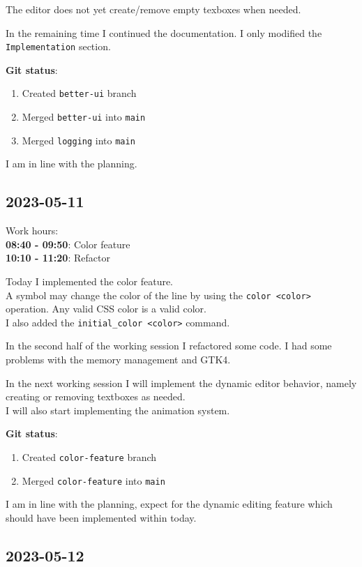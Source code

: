 \documentclass{article}
\begin{document}
The editor does not yet create/remove empty texboxes when needed.

In the remaining time I continued the documentation.
I only modified the \texttt{Implementation} section.

\textbf{Git status}:
\begin{enumerate}
    \item Created \texttt{better-ui} branch
    \item Merged \texttt{better-ui} into \texttt{main}
    \item Merged \texttt{logging} into \texttt{main}
\end{enumerate}

I am in line with the planning.

\pagebreak

\subsection{2023-05-11}

Work hours:\\
\textbf{08:40 - 09:50}: Color feature \\
\textbf{10:10 - 11:20}: Refactor

Today I implemented the color feature. \\
A symbol may change the color of the line by using the \texttt{color <color>} operation.
Any valid CSS color is a valid color.
\\ I also added the \texttt{initial\_color <color>} command.

In the second half of the working session I refactored some code.
I had some problems with the memory management and GTK4.

In the next working session I will implement the dynamic editor behavior, namely
creating or removing textboxes as needed. \\
I will also start implementing the animation system.

\textbf{Git status}:
\begin{enumerate}
    \item Created \texttt{color-feature} branch
    \item Merged \texttt{color-feature} into \texttt{main}
\end{enumerate}

I am in line with the planning, expect for the dynamic editing feature which should have been implemented within today.

\subsection{2023-05-12}
\end{document}
